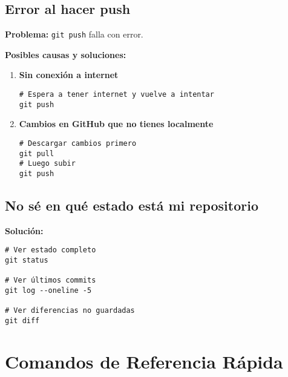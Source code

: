 \documentclass[11pt,a4paper]{article}
\begin{document}
\subsection{Error al hacer push}

\textbf{Problema:} \texttt{git push} falla con error.

\textbf{Posibles causas y soluciones:}
\begin{enumerate}
  \item \textbf{Sin conexión a internet}
    \begin{lstlisting}[style=bashstyle]
# Espera a tener internet y vuelve a intentar
git push
    \end{lstlisting}

  \item \textbf{Cambios en GitHub que no tienes localmente}
    \begin{lstlisting}[style=bashstyle]
# Descargar cambios primero
git pull
# Luego subir
git push
    \end{lstlisting}
\end{enumerate}

\subsection{No sé en qué estado está mi repositorio}

\textbf{Solución:}
\begin{lstlisting}[style=bashstyle]
# Ver estado completo
git status

# Ver últimos commits
git log --oneline -5

# Ver diferencias no guardadas
git diff
\end{lstlisting}

\section{Comandos de Referencia Rápida}
\end{document}
